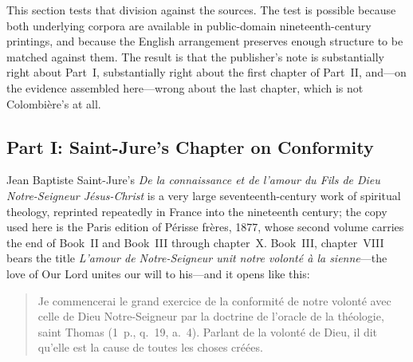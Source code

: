 This section tests that division against the sources. The test is possible because both underlying corpora are available in public-domain nineteenth-century printings, and because the English arrangement preserves enough structure to be matched against them. The result is that the publisher's note is substantially right about Part~I, substantially right about the first chapter of Part~II, and---on the evidence assembled here---wrong about the last chapter, which is not Colombière's at all.

\subsection{Part I: Saint-Jure's Chapter on Conformity}

Jean Baptiste Saint-Jure's \emph{De la connaissance et de l'amour du Fils de Dieu Notre-Seigneur Jésus-Christ} is a very large seventeenth-century work of spiritual theology, reprinted repeatedly in France into the nineteenth century; the copy used here is the Paris edition of Périsse frères, 1877, whose second volume carries the end of Book~II and Book~III through chapter~X. Book~III, chapter~VIII bears the title \emph{L'amour de Notre-Seigneur unit notre volonté à la sienne}---the love of Our Lord unites our will to his---and it opens like this:

\begin{quote}
\footnotesize Je commencerai le grand exercice de la conformité de notre volonté avec celle de Dieu Notre-Seigneur par la doctrine de l'oracle de la théologie, saint Thomas (1~p., q.~19, a.~4). Parlant de la volonté de Dieu, il dit qu'elle est la cause de toutes les choses créées.
\end{quote}

